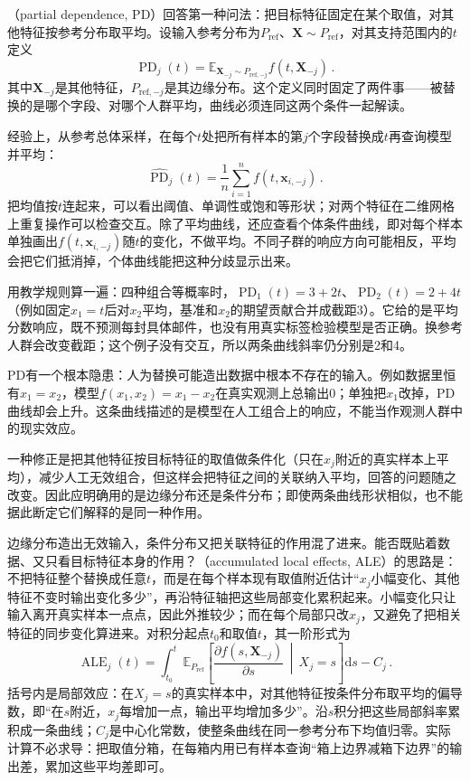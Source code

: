 （partial dependence, PD）回答第一种问法：把目标特征固定在某个取值，对其他特征按参考分布取平均。设输入参考分布为$P_{\mathrm{ref}}$、$\bm X\sim P_{\mathrm{ref}}$，对其支持范围内的$t$定义
\[
 \operatorname{PD}_j(t)
 =\mathbb E_{\bm X_{-j}\sim P_{\mathrm{ref},-j}}
 f(t,\bm X_{-j})\, .
\]
其中$\bm X_{-j}$是其他特征，$P_{\mathrm{ref},-j}$是其边缘分布。这个定义同时固定了两件事——被替换的是哪个字段、对哪个人群平均，曲线必须连同这两个条件一起解读。

经验上，从参考总体采样，在每个$t$处把所有样本的第$j$个字段替换成$t$再查询模型并平均：
\[
 \widehat{\operatorname{PD}}_j(t)
 =\frac1n\sum_{i=1}^n f(t,\bm{x}_{i,-j})\, .
\]
把均值按$t$连起来，可以看出阈值、单调性或饱和等形状；对两个特征在二维网格上重复操作可以检查交互。除了平均曲线，还应查看个体条件曲线，即对每个样本单独画出$f(t,\bm x_{i,-j})$随$t$的变化，不做平均。不同子群的响应方向可能相反，平均会把它们抵消掉，个体曲线能把这种分歧显示出来。

用教学规则算一遍：四种组合等概率时，$\operatorname{PD}_1(t)=3+2t$、$\operatorname{PD}_2(t)=2+4t$（例如固定$x_1=t$后对$x_2$平均，基准和$x_2$的期望贡献合并成截距3）。它给的是平均分数响应，既不预测每封具体邮件，也没有用真实标签检验模型是否正确。换参考人群会改变截距；这个例子没有交互，所以两条曲线斜率仍分别是2和4。

PD有一个根本隐患：人为替换可能造出数据中根本不存在的输入。例如数据里恒有$x_1=x_2$，模型$f(x_1,x_2)=x_1-x_2$在真实观测上总输出0；单独把$x_1$改掉，PD曲线却会上升。这条曲线描述的是模型在人工组合上的响应，不能当作观测人群中的现实效应。

一种修正是把其他特征按目标特征的取值做条件化（只在$x_j$附近的真实样本上平均），减少人工无效组合，但这样会把特征之间的关联纳入平均，回答的问题随之改变。因此应明确用的是边缘分布还是条件分布；即使两条曲线形状相似，也不能据此断定它们解释的是同一种作用。

边缘分布造出无效输入，条件分布又把关联特征的作用混了进来。能否既贴着数据、又只看目标特征本身的作用？（accumulated local effects, ALE）的思路是：不把特征整个替换成任意$t$，而是在每个样本现有取值附近估计“$x_j$小幅变化、其他特征不变时输出变化多少”，再沿特征轴把这些局部变化累积起来。小幅变化只让输入离开真实样本一点点，因此外推较少；而在每个局部只改$x_j$，又避免了把相关特征的同步变化算进来。对积分起点$t_0$和取值$t$，其一阶形式为
\begin{equation}
 \operatorname{ALE}_j(t)
 =\int_{t_0}^{t}
 \mathbb E_{P_{\mathrm{ref}}}\!\left[
 \frac{\partial f(s,\bm X_{-j})}{\partial s}
 \,\middle|\,X_j=s\right]\mathrm ds-C_j\, .
 \label{eq:interpretability-ale}
\end{equation}
括号内是局部效应：在$X_j=s$的真实样本中，对其他特征按条件分布取平均的偏导数，即“在$s$附近，$x_j$每增加一点，输出平均增加多少”。沿$s$积分把这些局部斜率累积成一条曲线；$C_j$是中心化常数，使整条曲线在同一参考分布下均值归零。实际计算不必求导：把取值分箱，在每箱内用已有样本查询“箱上边界减箱下边界”的输出差，累加这些平均差即可。

